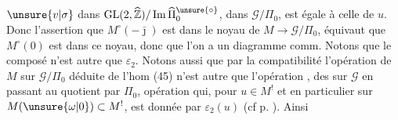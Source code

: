 $\unsure{v|\sigma}$ dans $\mathrm{GL}(2,\widehat{\mathbb Z})/\operatorname{Im}\widehat{\Pi}_0^{\unsure{\circ}}$,  dans $\mathcal G/\Pi_0$, est égale à celle de $u$. Donc l'assertion que $M^\circ(-\bar\jmath)$ est dans le noyau de $M\longrightarrow\mathcal G/\Pi_0$, équivaut  que $M^\circ(0)$ est dans ce noyau, donc que l'on a un diagramme comm.
Notons que le composé
n'est autre que $\varepsilon_2$. Notons aussi que par la compatibilité
l'opération de $M$ sur $\mathcal G/\Pi_0$ déduite de l'hom (45) n'est autre que l'opération , des  sur $\mathcal G$ en passant au quotient par $\Pi_0$, opération qui, pour $u\in M^!$ et en particulier sur $M(\unsure{\omega|0})\subset M^!$, est donnée par $\varepsilon_2(u)$ (cf p. ). Ainsi

